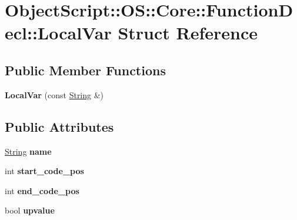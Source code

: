 \hypertarget{struct_object_script_1_1_o_s_1_1_core_1_1_function_decl_1_1_local_var}{}\section{Object\+Script\+:\+:OS\+:\+:Core\+:\+:Function\+Decl\+:\+:Local\+Var Struct Reference}
\label{struct_object_script_1_1_o_s_1_1_core_1_1_function_decl_1_1_local_var}
\subsection*{Public Member Functions}
\begin{DoxyCompactItemize}
\item 
{\bfseries Local\+Var} (const \hyperlink{class_object_script_1_1_o_s_1_1_core_1_1_string}{String} \&)\hypertarget{struct_object_script_1_1_o_s_1_1_core_1_1_function_decl_1_1_local_var_aca4d2fbccc979957394d6977ef0cbf6a}{}\label{struct_object_script_1_1_o_s_1_1_core_1_1_function_decl_1_1_local_var_aca4d2fbccc979957394d6977ef0cbf6a}

\end{DoxyCompactItemize}
\subsection*{Public Attributes}
\begin{DoxyCompactItemize}
\item 
\hyperlink{class_object_script_1_1_o_s_1_1_core_1_1_string}{String} {\bfseries name}\hypertarget{struct_object_script_1_1_o_s_1_1_core_1_1_function_decl_1_1_local_var_ac3fcec6979162c5bfee42564fb176f5a}{}\label{struct_object_script_1_1_o_s_1_1_core_1_1_function_decl_1_1_local_var_ac3fcec6979162c5bfee42564fb176f5a}

\item 
int {\bfseries start\+\_\+code\+\_\+pos}\hypertarget{struct_object_script_1_1_o_s_1_1_core_1_1_function_decl_1_1_local_var_ad46a9a9a1e7b2a9fafb4607749a6e70e}{}\label{struct_object_script_1_1_o_s_1_1_core_1_1_function_decl_1_1_local_var_ad46a9a9a1e7b2a9fafb4607749a6e70e}

\item 
int {\bfseries end\+\_\+code\+\_\+pos}\hypertarget{struct_object_script_1_1_o_s_1_1_core_1_1_function_decl_1_1_local_var_ae9cc3cfa76d2fd73afcb554747bc1e49}{}\label{struct_object_script_1_1_o_s_1_1_core_1_1_function_decl_1_1_local_var_ae9cc3cfa76d2fd73afcb554747bc1e49}

\item 
bool {\bfseries upvalue}\hypertarget{struct_object_script_1_1_o_s_1_1_core_1_1_function_decl_1_1_local_var_ac3e7c257292b62f95bd732be3b6a5416}{}\label{struct_object_script_1_1_o_s_1_1_core_1_1_function_decl_1_1_local_var_ac3e7c257292b62f95bd732be3b6a5416}

\end{DoxyCompactItemize}


